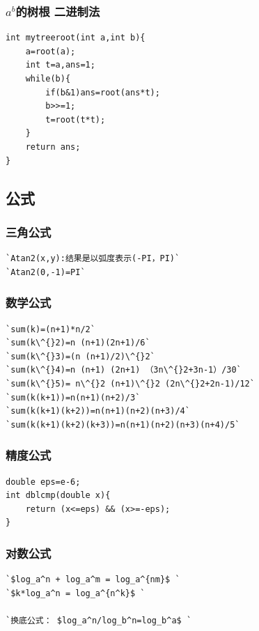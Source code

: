\documentclass[a4paper]{article}
\begin{document}
\begin{CJK*}{UTF8}{gbsn}
\begin{multicols}{3}
\begin{flushleft}
\subsubsection{$a^b$的树根 二进制法}
\begin{lstlisting}
int mytreeroot(int a,int b){
	a=root(a);
	int t=a,ans=1;
	while(b){
		if(b&1)ans=root(ans*t);
		b>>=1;
		t=root(t*t);
	}
	return ans;
}
\end{lstlisting}

\subsection{公式}

\subsubsection{三角公式}
\begin{lstlisting}
`Atan2(x,y):结果是以弧度表示(-PI，PI)`
`Atan2(0,-1)=PI`
\end{lstlisting}

\subsubsection{数学公式}
\begin{lstlisting}
`sum(k)=(n+1)*n/2`
`sum(k\^{}2)=n (n+1)(2n+1)/6`
`sum(k\^{}3)=(n (n+1)/2)\^{}2`
`sum(k\^{}4)=n (n+1) (2n+1) （3n\^{}2+3n-1）/30`
`sum(k\^{}5)= n\^{}2 (n+1)\^{}2 (2n\^{}2+2n-1)/12`
`sum(k(k+1))=n(n+1)(n+2)/3`
`sum(k(k+1)(k+2))=n(n+1)(n+2)(n+3)/4`
`sum(k(k+1)(k+2)(k+3))=n(n+1)(n+2)(n+3)(n+4)/5`
\end{lstlisting}

\subsubsection{精度公式}
\begin{lstlisting}
double eps=e-6;
int dblcmp(double x){
	return (x<=eps) && (x>=-eps);
}
\end{lstlisting}

\subsubsection{对数公式}
\begin{lstlisting}
`$log_a^n + log_a^m = log_a^{nm}$ `
`$k*log_a^n = log_a^{n^k}$ `

`换底公式： $log_a^n/log_b^n=log_b^a$ `
\end{lstlisting}



\end{flushleft}
\end{multicols}
\end{CJK*}
\end{document}
